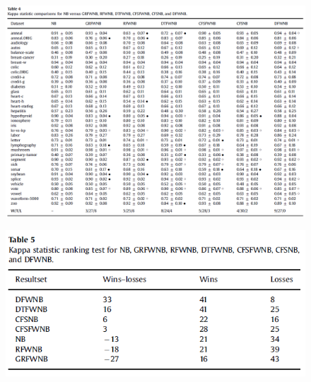 \documentclass[12pt, a4paper]{article}
\begin{document}
\begin{figure}
    \centering
    \includegraphics[width=\linewidth]{images/article1/table4.png}
    \caption{}
    \label{a1_table4}
\end{figure}
\begin{figure}
    \centering
    \includegraphics[width=\linewidth]{images/article1/table5.png}
    \caption{}
    \label{a1_table5}
\end{figure}

\clearpage
\end{document}
